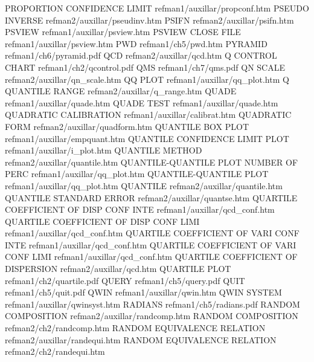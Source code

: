 PROPORTION CONFIDENCE LIMIT             refman1/auxillar/propconf.htm
PSEUDO INVERSE                          refman2/auxillar/pseudinv.htm
PSIFN                                   refman2/auxillar/psifn.htm
PSVIEW                                  refman1/auxillar/psview.htm
PSVIEW CLOSE FILE                       refman1/auxillar/psview.htm
PWD                                     refman1/ch5/pwd.htm
PYRAMID                                 refman1/ch6/pyramid.pdf
QCD                                     refman2/auxillar/qcd.htm
Q CONTROL CHART                         refman1/ch2/qcontrol.pdf
QMS                                     refman1/ch7/qms.pdf
QN SCALE                                refman2/auxillar/qn_scale.htm
QQ PLOT                                 refman1/auxillar/qq_plot.htm
Q QUANTILE RANGE                        refman2/auxillar/q_range.htm
QUADE                                   refman1/auxillar/quade.htm
QUADE TEST                              refman1/auxillar/quade.htm
QUADRATIC CALIBRATION                   refman1/auxillar/calibrat.htm
QUADRATIC FORM                          refman2/auxillar/quadform.htm
QUANTILE BOX PLOT                       refman1/auxillar/empquant.htm
QUANTILE CONFIDENCE LIMIT PLOT          refman1/auxillar/i_plot.htm
QUANTILE METHOD                         refman2/auxillar/quantile.htm
QUANTILE-QUANTILE PLOT NUMBER OF PERC   refman1/auxillar/qq_plot.htm
QUANTILE-QUANTILE PLOT                  refman1/auxillar/qq_plot.htm
QUANTILE                                refman2/auxillar/quantile.htm
QUANTILE STANDARD ERROR                 refman2/auxillar/quantse.htm
QUARTILE COEFFICIENT OF DISP CONF INTE  refman1/auxillar/qcd_conf.htm
QUARTILE COEFFICIENT OF DISP CONF LIMI  refman1/auxillar/qcd_conf.htm
QUARTILE COEFFICIENT OF VARI CONF INTE  refman1/auxillar/qcd_conf.htm
QUARTILE COEFFICIENT OF VARI CONF LIMI  refman1/auxillar/qcd_conf.htm
QUARTILE COEFFICIENT OF DISPERSION      refman2/auxillar/qcd.htm
QUARTILE PLOT                           refman1/ch2/quartile.pdf
QUERY                                   refman1/ch5/query.pdf
QUIT                                    refman1/ch5/quit.pdf
QWIN                                    refman1/auxillar/qwin.htm
QWIN SYSTEM                             refman1/auxillar/qwinsyst.htm
RADIANS                                 refman1/ch5/radians.pdf
RANDOM COMPOSITION                      refman2/auxillar/randcomp.htm
RANDOM COMPOSITION                      refman2/ch2/randcomp.htm
RANDOM EQUIVALENCE RELATION             refman2/auxillar/randequi.htm
RANDOM EQUIVALENCE RELATION             refman2/ch2/randequi.htm
